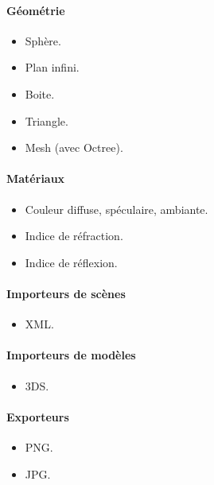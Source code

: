 \paragraph{Géométrie}
\begin{itemize}
  \item Sphère.
  \item Plan infini.
  \item Boite.
  \item Triangle.
  \item Mesh (avec Octree).
\end{itemize}

\paragraph{Matériaux}
\begin{itemize}
  \item Couleur diffuse, spéculaire, ambiante.
  \item Indice de réfraction.
  \item Indice de réflexion.
\end{itemize}

\paragraph{Importeurs de scènes}
\begin{itemize}
  \item XML.
\end{itemize}

\paragraph{Importeurs de modèles}
\begin{itemize}
  \item 3DS.
\end{itemize}

\paragraph{Exporteurs}
\begin{itemize}
  \item PNG.
  \item JPG.
\end{itemize}
